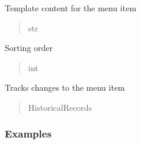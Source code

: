 \documentclass[letterpaper,10pt,english]{sphinxmanual}
\begin{document}
\begin{fulllineitems}
\begin{fulllineitems}
\label{\detokenize{pages_app.models:pages_app.models.MenuItem.template}}
\pysigstartsignatures
\pysigline
{}
\pysigstopsignatures
\sphinxAtStartPar
Template content for the menu item
\begin{quote}\begin{description}
\sphinxAtStartPar
str

\end{description}\end{quote}

\end{fulllineitems}


\begin{fulllineitems}
\label{\detokenize{pages_app.models:pages_app.models.MenuItem.sorting}}
\pysigstartsignatures
\pysigline
{}
\pysigstopsignatures
\sphinxAtStartPar
Sorting order
\begin{quote}\begin{description}
\sphinxAtStartPar
int

\end{description}\end{quote}

\end{fulllineitems}


\begin{fulllineitems}
\label{\detokenize{pages_app.models:pages_app.models.MenuItem.history}}
\pysigstartsignatures
\pysigline
{}
\pysigstopsignatures
\sphinxAtStartPar
Tracks changes to the menu item
\begin{quote}\begin{description}
\sphinxAtStartPar
HistoricalRecords

\end{description}\end{quote}

\end{fulllineitems}

\subsubsection*{Examples}


\end{fulllineitems}
\end{document}
